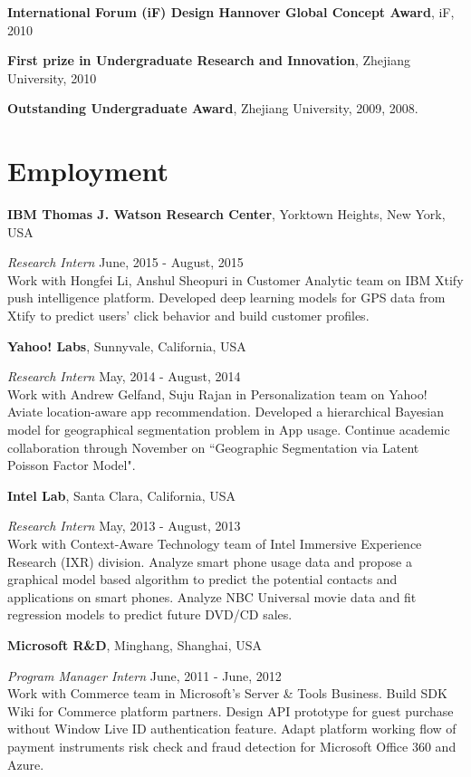 \documentclass[margin,line]{res}
\begin{document}
\begin{resume}

\textbf{International Forum (iF) Design Hannover Global Concept Award}, iF, 2010 

\textbf{First prize in Undergraduate Research and Innovation}, Zhejiang University, 2010   

\textbf{Outstanding Undergraduate Award}, Zhejiang University, 2009, 2008. 

\section{\sc Employment} 
{\bf  IBM Thomas J. Watson Research Center}, Yorktown Heights, New York, USA

\vspace{-.3cm}
{\em Research Intern} \hfill { June, 2015 - August, 2015}\\
Work with Hongfei Li, Anshul Sheopuri in Customer Analytic team on IBM Xtify push intelligence platform. Developed deep learning models for GPS data from Xtify to predict users' click behavior and build customer profiles. 


{\bf  Yahoo! Labs}, Sunnyvale, California, USA

\vspace{-.3cm}
{\em Research Intern} \hfill { May, 2014 - August, 2014}\\
Work with Andrew Gelfand, Suju Rajan in Personalization team on Yahoo! Aviate location-aware app recommendation. Developed a hierarchical Bayesian model for geographical segmentation problem in App usage. Continue academic collaboration through November on ``Geographic Segmentation via Latent Poisson Factor Model".



{\bf  Intel Lab}, Santa Clara, California, USA

\vspace{-.3cm}
{\em Research Intern} \hfill { May, 2013 - August, 2013}\\
Work with Context-Aware Technology team of Intel Immersive Experience Research (IXR) division. 
Analyze smart phone usage data and propose a graphical model based algorithm to predict the potential contacts and applications on smart phones.
Analyze NBC Universal movie data and fit regression models to predict future DVD/CD sales.

{\bf  Microsoft R\&D}, Minghang, Shanghai, USA

\vspace{-.3cm}
{\em Program Manager Intern} \hfill {June, 2011 
- June, 2012}\\
 Work with Commerce team in Microsoft’s Server \& Tools Business.
 Build SDK Wiki for Commerce platform partners.  
 Design API prototype for guest purchase without Window Live ID authentication feature.
Adapt platform working flow of payment instruments risk check and fraud detection for Microsoft Office 360 and Azure.



\end{resume}
\end{document}
